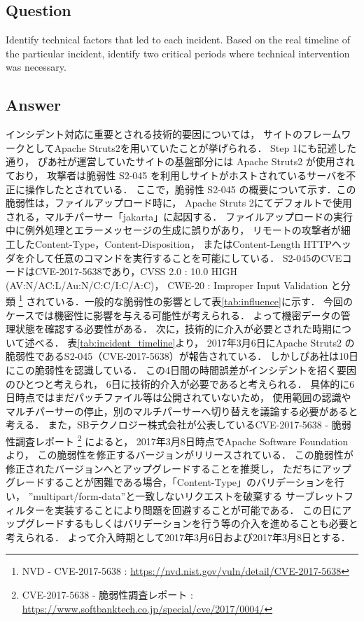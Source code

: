 \documentclass[uplatex]{jsarticle}
\begin{document}
\subsection*{Question}
Identify technical factors that led to each incident. Based on the real timeline of the particular incident, identify two critical periods where technical intervention was necessary.
\subsection*{Answer}
インシデント対応に重要とされる技術的要因については，
サイトのフレームワークとしてApache Struts2を用いていたことが挙げられる．
Step 1にも記述した通り，
ぴあ社が運営していたサイトの基盤部分には Apache Struts2 が使用されており，
攻撃者は脆弱性 S2-045 を利用しサイトがホストされているサーバを不正に操作したとされている．
ここで，脆弱性 S2-045 の概要について示す．この脆弱性は，ファイルアップロード時に，
Apache Struts 2にてデフォルトで使用される，マルチパーサー「jakarta」に起因する．
ファイルアップロードの実行中に例外処理とエラーメッセージの生成に誤りがあり，
リモートの攻撃者が細工したContent-Type，Content-Disposition，
またはContent-Length HTTPヘッダを介して任意のコマンドを実行することを可能にしている．
S2-045のCVEコードはCVE-2017-5638であり，CVSS 2.0 : 10.0 HIGH (AV:N/AC:L/Au:N/C:C/I:C/A:C)，
CWE-20 : Improper Input Validation と分類
\footnote{
    NVD - CVE-2017-5638
    : \url{https://nvd.nist.gov/vuln/detail/CVE-2017-5638}
}
されている．一般的な脆弱性の影響として表\ref{tab:influence}に示す．
今回のケースでは機密性に影響を与える可能性が考えられる．
よって機密データの管理状態を確認する必要性がある．
次に，技術的に介入が必要とされた時期について述べる．
表\ref{tab:incident_timeline}より，
2017年3月6日にApache Struts2 の脆弱性であるS2-045（CVE-2017-5638）が報告されている．
しかしぴあ社は10日にこの脆弱性を認識している．
この4日間の時間誤差がインシデントを招く要因のひとつと考えられ，
6日に技術的介入が必要であると考えられる．
具体的に6日時点ではまだパッチファイル等は公開されていないため，
使用範囲の認識やマルチパーサーの停止，別のマルチパーサーへ切り替えを議論する必要があると考える．
また，SBテクノロジー株式会社が公表しているCVE-2017-5638 - 脆弱性調査レポート
\footnote{
    CVE-2017-5638 - 脆弱性調査レポート
    : \url{https://www.softbanktech.co.jp/special/cve/2017/0004/}
}
によると，
2017年3月8日時点でApache Software Foundation より，
この脆弱性を修正するバージョンがリリースされている．
この脆弱性が修正されたバージョンへとアップグレードすることを推奨し，
ただちにアップグレードすることが困難である場合，「Content-Type」のバリデーションを行い，
”multipart/form-data”と一致しないリクエストを破棄する
サーブレットフィルターを実装することにより問題を回避することが可能である．
この日にアップグレードするもしくはバリデーションを行う等の介入を進めることも必要と考えられる．
よって介入時期として2017年3月6日および2017年3月8日とする．
\end{document}
